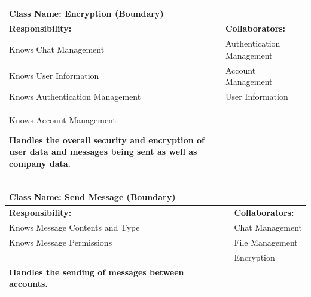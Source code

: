 \documentclass[]{article}
\begin{document}
\begin{itemize}
	\begin{table}[ht]
		\centering
		\begin{tabular}{|p{7cm}|p{7cm}|}
		\hline 
		 \multicolumn{2}{|l|}{\textbf{Class Name:}  Encryption (Boundary)} \\
		\hline
		\textbf{Responsibility:} & \textbf{Collaborators:} \\
		\hline
            Knows Chat Management & Authentication Management\\
            Knows User Information & Account Management\\
            Knows Authentication Management & User Information\\
            Knows Account Management
            
            \vspace{0.1in}
            \textbf{Handles the overall security and encryption of user data and messages being sent as well as company data.}

		\vspace{1in} & \\
		\hline
  
		\end{tabular}
	\end{table}

	\begin{table}[ht]
		\centering
		\begin{tabular}{|p{7cm}|p{7cm}|}
		\hline 
		 \multicolumn{2}{|l|}{\textbf{Class Name:} Send Message (Boundary)} \\
		\hline
		\textbf{Responsibility:} & \textbf{Collaborators:} \\
		\hline
            Knows Message Contents and Type & Chat Management\\
            Knows Message Permissions & File Management\\
            & Encryption\\
            
            \vspace{0.1in}
            \textbf{Handles the sending of messages between accounts.}

		\vspace{1in} & \\
		\hline
  
		\end{tabular}
	\end{table}


\end{itemize}
\end{document}
